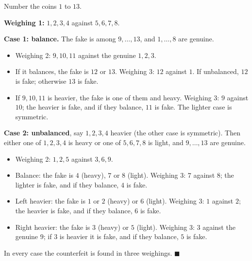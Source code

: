 Number the coins $1$ to $13$.

\textbf{Weighing 1:} $1,2,3,4$ against $5,6,7,8$.

\textbf{Case 1: balance.} The fake is among $9,\dots,13$, and $1,\dots,8$ are genuine.
\begin{itemize}
\item Weighing 2: $9,10,11$ against the genuine $1,2,3$.
\item If it balances, the fake is $12$ or $13$. Weighing 3: $12$ against $1$. If unbalanced, $12$ is fake; otherwise $13$ is fake.
\item If $9,10,11$ is heavier, the fake is one of them and heavy. Weighing 3: $9$ against $10$; the heavier is fake, and if they balance, $11$ is fake. The lighter case is symmetric.
\end{itemize}

\textbf{Case 2: unbalanced}, say $1,2,3,4$ heavier (the other case is symmetric). Then either one of $1,2,3,4$ is heavy or one of $5,6,7,8$ is light, and $9,\dots,13$ are genuine.
\begin{itemize}
\item Weighing 2: $1,2,5$ against $3,6,9$.
\item Balance: the fake is $4$ (heavy), $7$ or $8$ (light). Weighing 3: $7$ against $8$; the lighter is fake, and if they balance, $4$ is fake.
\item Left heavier: the fake is $1$ or $2$ (heavy) or $6$ (light). Weighing 3: $1$ against $2$; the heavier is fake, and if they balance, $6$ is fake.
\item Right heavier: the fake is $3$ (heavy) or $5$ (light). Weighing 3: $3$ against the genuine $9$; if $3$ is heavier it is fake, and if they balance, $5$ is fake.
\end{itemize}
In every case the counterfeit is found in three weighings. $\blacksquare$
